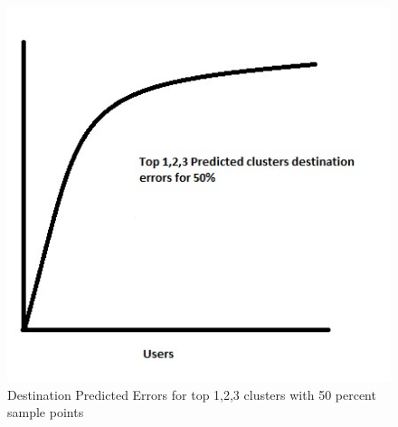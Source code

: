 \begin{figure}
\centering     
\includegraphics[scale=0.4]{figs/nextloc_50.jpg}
\caption{Destination Predicted Errors for top 1,2,3 clusters with 50 percent sample points}
\label{fig:next_loc_50}  
\end{figure} 


